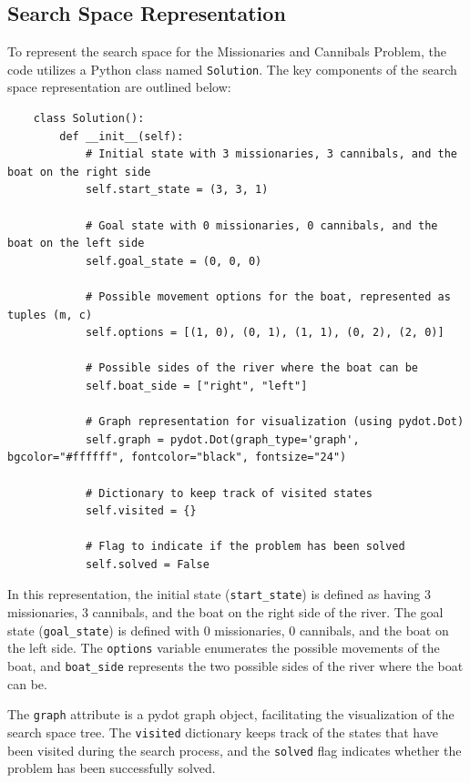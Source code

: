 \documentclass[12pt]{article}
\begin{document}
\subsection{Search Space Representation}
To represent the search space for the Missionaries and Cannibals Problem, the code utilizes a Python class named \texttt{Solution}. 
The key components of the search space representation are outlined below:
\begin{verbatim}
    class Solution():
        def __init__(self):
            # Initial state with 3 missionaries, 3 cannibals, and the boat on the right side
            self.start_state = (3, 3, 1)
            
            # Goal state with 0 missionaries, 0 cannibals, and the boat on the left side
            self.goal_state = (0, 0, 0)
            
            # Possible movement options for the boat, represented as tuples (m, c)
            self.options = [(1, 0), (0, 1), (1, 1), (0, 2), (2, 0)]
            
            # Possible sides of the river where the boat can be
            self.boat_side = ["right", "left"]
            
            # Graph representation for visualization (using pydot.Dot)
            self.graph = pydot.Dot(graph_type='graph', bgcolor="#ffffff", fontcolor="black", fontsize="24")      
            
            # Dictionary to keep track of visited states
            self.visited = {}
            
            # Flag to indicate if the problem has been solved
            self.solved = False
    \end{verbatim}
    \vspace*{5mm}
In this representation, the initial state (\texttt{start\_state}) is defined as having 3 missionaries, 3 cannibals, and the boat on the right side of the river. The goal state (\texttt{goal\_state}) is defined with 0 missionaries, 0 cannibals, and the boat on the left side. The \texttt{options} variable enumerates the possible movements of the boat, and \texttt{boat\_side} represents the two possible sides of the river where the boat can be.

The \texttt{graph} attribute is a pydot graph object, facilitating the visualization of the search space tree. The \texttt{visited} dictionary keeps track of the states that have been visited during the search process, and the \texttt{solved} flag indicates whether the problem has been successfully solved.
\end{document}

